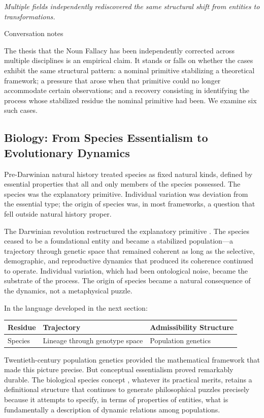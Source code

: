 \documentclass[12pt, a4paper]{article}
\theoremstyle{plain}
\theoremstyle{definition}
\theoremstyle{remark}
\begin{document}
\epigraph{\textit{Multiple fields independently rediscovered the same
structural shift from entities to transformations.}}{Conversation notes}

\noindent
The thesis that the Noun Fallacy has been independently corrected across
multiple disciplines is an empirical claim. It stands or falls on whether
the cases exhibit the same structural pattern: a nominal primitive stabilizing
a theoretical framework; a pressure that arose when that primitive could no
longer accommodate certain observations; and a recovery consisting in
identifying the process whose stabilized residue the nominal primitive had been.
We examine six such cases.

\subsection{Biology: From Species Essentialism to Evolutionary Dynamics}

Pre-Darwinian natural history treated species as fixed natural kinds, defined
by essential properties that all and only members of the species possessed.
The species was the explanatory primitive. Individual variation was deviation
from the essential type; the origin of species was, in most frameworks,
a question that fell outside natural history proper.

The Darwinian revolution restructured the explanatory primitive
\citep{darwin1859}. The species ceased to be a foundational entity and became
a stabilized population---a trajectory through genetic space that remained
coherent as long as the selective, demographic, and reproductive dynamics
that produced its coherence continued to operate. Individual variation, which
had been ontological noise, became the substrate of the process. The origin
of species became a natural consequence of the dynamics, not a metaphysical
puzzle.

In the language developed in the next section:

\begin{center}
\begin{tabular}{lll}
\toprule
\textbf{Residue} & \textbf{Trajectory} & \textbf{Admissibility Structure} \\
\midrule
Species & Lineage through genotype space & Population genetics \\
\bottomrule
\end{tabular}
\end{center}

Twentieth-century population genetics \citep{fisher1930,wright1932} provided
the mathematical framework that made this picture precise. But conceptual
essentialism proved remarkably durable. The biological species concept
\citep{mayr1942}, whatever its practical merits, retains a definitional
structure that continues to generate philosophical puzzles precisely because
it attempts to specify, in terms of properties of entities, what is
fundamentally a description of dynamic relations among populations.
\end{document}
